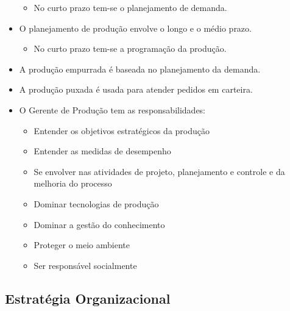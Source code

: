 \documentclass{article}
\begin{document}
\begin{itemize}
    \begin{itemize}
        \item No curto prazo tem-se o planejamento de demanda.
    \end{itemize}
    \item O planejamento de produção envolve o longo e o médio prazo.
    \begin{itemize}
        \item No curto prazo tem-se a programação da produção.
    \end{itemize}
    \item A produção empurrada é baseada no planejamento da demanda.
    \item A produção puxada é usada para atender pedidos em carteira.
    \item O Gerente de Produção tem as responsabilidades:
    \begin{itemize}
        \item Entender os objetivos estratégicos da produção
        \item Entender as medidas de desempenho
        \item Se envolver nas atividades de projeto, planejamento e controle e da melhoria do processo
        \item Dominar tecnologias de produção
        \item Dominar a gestão do conhecimento
        \item Proteger o meio ambiente
        \item Ser responsável socialmente
    \end{itemize}
\end{itemize}

\subsection{Estratégia Organizacional}
\end{document}
